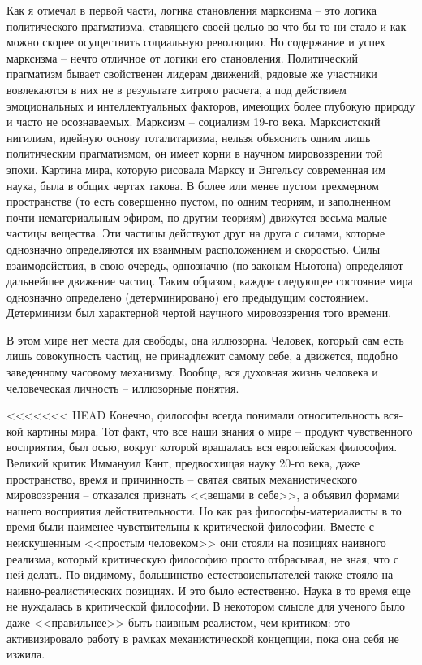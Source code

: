 \documentclass{book}
\begin{document}
Как я отмечал в первой части, логика становления марксизма -- это логика политического прагматизма, ставящего своей целью во что бы то ни стало и как можно скорее осуществить социальную революцию. Но содержание и успех марксизма -- нечто отличное от логики его становления. Политический прагматизм бывает свойственен лидерам движений, рядовые же участники вовлекаются в них не в результате хитрого расчета, а под действием эмоциональных и интеллектуальных факторов, имеющих более глубокую природу и часто не осознаваемых. Марксизм -- социализм 19-го века. Марксистский нигилизм, идейную основу тоталитаризма, нельзя объяснить одним лишь политическим прагматизмом, он имеет корни в научном мировоззрении той эпохи.
Картина мира, которую рисовала Марксу и Энгельсу совре­менная им наука, была в общих чертах такова. В более или менее пустом трехмерном пространстве (то есть совершенно пустом, по одним теориям, и заполненном почти нематериальным эфиром, по другим теориям) движутся весьма малые частицы вещества. Эти частицы действуют друг на друга с силами, кото­рые однозначно определяются их взаимным расположением и скоростью. Силы взаимодействия, в свою очередь, однознач­но (по законам Ньютона) определяют дальнейшее движение частиц. Таким образом, каждое следующее состояние мира однозначно определено (детерминировано) его предыдущим состоянием. Детерминизм был характерной чертой научного мировоззрения того времени.

В этом мире нет места для свободы, она иллюзорна. Человек, который сам есть лишь совокупность частиц, не принадлежит самому себе, а движется, подобно заведенному часовому меха­низму. Вообще, вся духовная жизнь человека и человеческая личность -- иллюзорные понятия.

<<<<<<< HEAD
Конечно, философы всегда понимали относительность вся­кой картины мира. Тот факт, что все наши знания о мире -- продукт чувственного восприятия, был осью, вокруг которой вращалась вся европейская философия. Великий критик Иммануил Кант, предвосхищая науку 20‑го века, даже пространство, время и причинность -- святая святых механистического мировоззрения -- отказался признать <<вещами в себе>>, а объявил формами нашего восприятия действительности. Но как раз философы‑материалисты в то время были наименее чувствительны к критической философии. Вместе с неискушенным <<простым человеком>> они стояли на позициях наивного реализма, который критическую философию просто отбрасывал, не зная, что с ней делать. По‑видимому, большинство естествоиспытателей также стояло на наивно‑реалистических позициях. И это было естественно. Наука в то время еще не нуждалась в критической философии. В некотором смысле для ученого было даже <<правильнее>> быть наивным реалистом, чем критиком: это активизировало работу в рамках механистической концепции, пока она себя не изжила.
\end{document}

